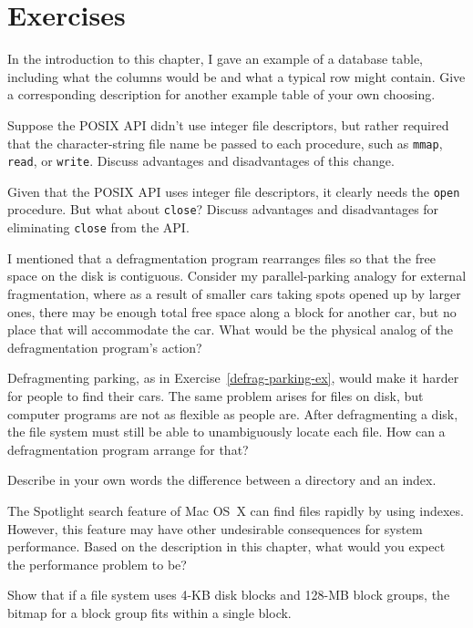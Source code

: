 \section*{Exercises}
\begin{chapterEnumerate}
\item In the introduction to this chapter, I gave an example of a
database table, including what the columns would be and what a typical
row might contain.  Give a corresponding description for another
example table of your own choosing.
\item Suppose the POSIX API didn't use integer file descriptors, but
rather required that the character-string file name be passed to each
procedure, such as \verb|mmap|, \verb|read|, or \verb|write|.  Discuss
advantages and disadvantages of this
change.
\item Given that the POSIX API uses integer file descriptors, it
clearly needs the \verb|open| procedure.   But what about
\verb|close|?  Discuss advantages and
disadvantages for eliminating \verb|close| from the API.
\item\label{defrag-parking-ex}
I mentioned that a defragmentation program rearranges files so that
the free space on the disk is contiguous.  Consider my
parallel-parking analogy for external fragmentation, where as a result
of smaller cars taking spots opened up by larger ones, there may
be enough total free space along a block for another car, but no place
that will accommodate the car.  What would be the physical analog of
the defragmentation program's action?
\item
Defragmenting parking, as in Exercise~\ref{defrag-parking-ex}, would
make it harder for people to find their cars.  The same problem arises
for files on disk, but computer programs are not as flexible as people are.
After defragmenting a disk, the file system must still be able to
unambiguously locate each
file.  How can a defragmentation program arrange for that?
\item
Describe in your own words the difference between a directory and an
index.
\item
The Spotlight search feature of Mac OS~X can find files rapidly by
using indexes.  However, this feature may have other undesirable
consequences for system performance.  Based on the description in this
chapter, what would you expect the performance problem to be?
\item\label{block-group-bitmap-exercise}
Show that if a file system uses 4-KB disk blocks and 128-MB block
groups, the bitmap for a block group fits within a single block.

\end{chapterEnumerate}
